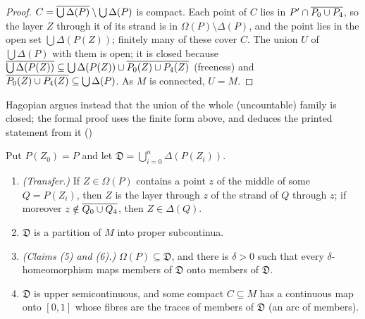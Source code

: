 \begin{proof}
$C=\overline{\bigcup\Delta(P)}\setminus\bigcup\Delta(P)$ is compact. Each point of $C$ lies in $P'\cap\overline{P_0\cup P_4}$, so the layer $Z$
through it of its strand is in $\Omega(P)\setminus\Delta(P)$, and the point lies in the open set $\bigcup\Delta(P(Z))$; finitely many of
these cover $C$. The union $U$ of $\bigcup\Delta(P)$ with them is open; it is closed because
$\overline{\bigcup\Delta(P(Z))}\subseteq\bigcup\Delta(P(Z))\cup\overline{P_0(Z)\cup P_4(Z)}$ (freeness) and $\overline{P_0(Z)\cup P_4(Z)}\subseteq\bigcup\Delta(P)$. As
$M$ is connected, $U=M$.
\end{proof}


Hagopian argues instead that the union of the whole (uncountable) family is closed; the formal proof uses the finite form
above, and deduces the printed statement from it ()

Put $P(Z_0)=P$ and let $\mathfrak D=\bigcup_{i=0}^n\Delta(P(Z_i))$.

\begin{theorem}\label{thm:frakD}
\leavevmode
\begin{enumerate}[label=(\alph*)]
\item \emph{(Transfer.)} If $Z\in\Omega(P)$ contains a point $z$ of the middle of some $Q=P(Z_i)$, then $Z$ is the layer through $z$ of
the strand of $Q$ through $z$; if moreover $z\notin\overline{Q_0\cup Q_4}$, then $Z\in\Delta(Q)$.
\item $\mathfrak D$ is a partition of $M$ into proper subcontinua.
\item \emph{(Claims (5) and (6).)} $\Omega(P)\subseteq\mathfrak D$, and there is $\delta>0$ such that every $\delta$-homeomorphism maps members of
$\mathfrak D$ onto members of $\mathfrak D$.
\item $\mathfrak D$ is upper semicontinuous, and some compact $C\subseteq M$ has a continuous map onto $[0,1]$ whose fibres are the traces of
members of $\mathfrak D$ (an arc of members).
\end{enumerate}
\end{theorem}

